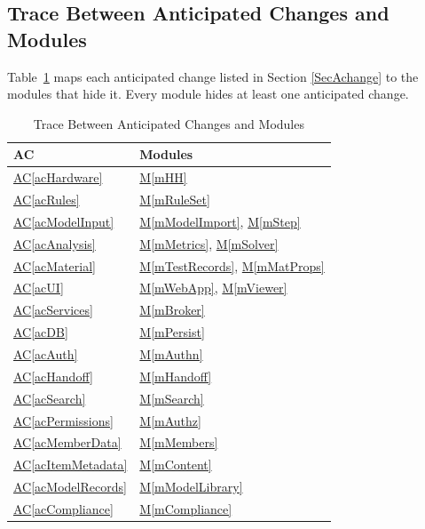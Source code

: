 \documentclass[12pt, titlepage]{article}
\newcommand{\acref}[1]{\hyperref[#1]{AC\ref*{#1}}}
\newcommand{\mref}[1]{\hyperref[#1:dec]{M\ref*{#1}}}
\begin{document}
\subsection{Trace Between Anticipated Changes and Modules} \label{SecTMAC}

Table~\ref{TblACT} maps each anticipated change listed in Section \ref{SecAchange} to the modules that hide it. Every module hides at least one anticipated change.

\begin{table}[H]
\centering
\begin{tabular}{p{} p{}}
\toprule
\textbf{AC} & \textbf{Modules}\\
\midrule
\acref{acHardware} & \mref{mHH}\\
\acref{acRules} & \mref{mRuleSet}\\
\acref{acModelInput} & \mref{mModelImport}, \mref{mStep}\\
\acref{acAnalysis} & \mref{mMetrics}, \mref{mSolver}\\
\acref{acMaterial} & \mref{mTestRecords}, \mref{mMatProps}\\
\acref{acUI} & \mref{mWebApp}, \mref{mViewer}\\
\acref{acServices} & \mref{mBroker}\\
\acref{acDB} & \mref{mPersist}\\
\acref{acAuth} & \mref{mAuthn}\\
\acref{acHandoff} & \mref{mHandoff}\\
\acref{acSearch} & \mref{mSearch}\\
\acref{acPermissions} & \mref{mAuthz}\\
\acref{acMemberData} & \mref{mMembers}\\
\acref{acItemMetadata} & \mref{mContent}\\
\acref{acModelRecords} & \mref{mModelLibrary}\\
\acref{acCompliance} & \mref{mCompliance}\\
\bottomrule
\end{tabular}
\caption{Trace Between Anticipated Changes and Modules}
\label{TblACT}
\end{table}
\end{document}
